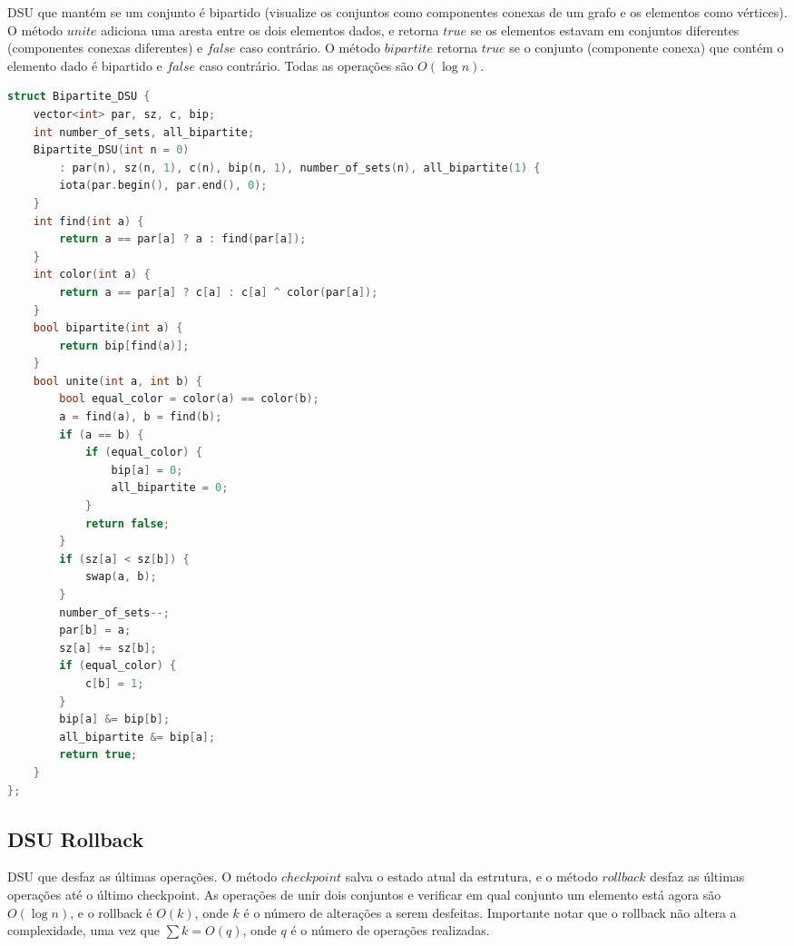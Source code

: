 \documentclass[11pt, a4paper, oneside]{book}
\begin{document}
DSU que mantém se um conjunto é bipartido (visualize os conjuntos como componentes conexas de um grafo e os elementos como vértices). O método $unite$ adiciona uma aresta entre os dois elementos dados, e retorna $true$ se os elementos estavam em conjuntos diferentes (componentes conexas diferentes) e $false$ caso contrário. O método $bipartite$ retorna $true$ se o conjunto (componente conexa) que contém o elemento dado é bipartido e $false$ caso contrário. Todas as operações são $O(\log n)$.
\hfill

\begin{multicols}{2}
\begin{lstlisting}[language=C++]
struct Bipartite_DSU {
    vector<int> par, sz, c, bip;
    int number_of_sets, all_bipartite;
    Bipartite_DSU(int n = 0)
        : par(n), sz(n, 1), c(n), bip(n, 1), number_of_sets(n), all_bipartite(1) {
        iota(par.begin(), par.end(), 0);
    }
    int find(int a) {
        return a == par[a] ? a : find(par[a]);
    }
    int color(int a) {
        return a == par[a] ? c[a] : c[a] ^ color(par[a]);
    }
    bool bipartite(int a) {
        return bip[find(a)];
    }
    bool unite(int a, int b) {
        bool equal_color = color(a) == color(b);
        a = find(a), b = find(b);
        if (a == b) {
            if (equal_color) {
                bip[a] = 0;
                all_bipartite = 0;
            }
            return false;
        }
        if (sz[a] < sz[b]) {
            swap(a, b);
        }
        number_of_sets--;
        par[b] = a;
        sz[a] += sz[b];
        if (equal_color) {
            c[b] = 1;
        }
        bip[a] &= bip[b];
        all_bipartite &= bip[a];
        return true;
    }
};
\end{lstlisting}
\end{multicols}

\hfill

\subsection{DSU Rollback}


DSU que desfaz as últimas operações. O método $checkpoint$ salva o estado atual da estrutura, e o método $rollback$ desfaz as últimas operações até o último checkpoint. As operações de unir dois conjuntos e verificar em qual conjunto um elemento está agora são $O(\log n)$, e o rollback é $O(k)$, onde $k$ é o número de alterações a serem desfeitas. Importante notar que o rollback não altera a complexidade, uma vez que $\sum k = O(q)$, onde $q$ é o número de operações realizadas.
\hfill
\end{document}
